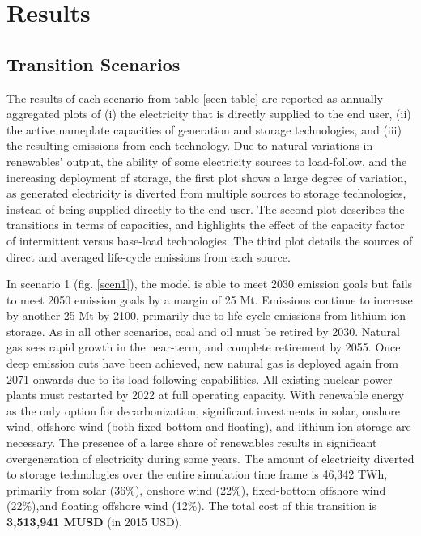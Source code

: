\section{Results} \label{Results-and-discussion}

\subsection{Transition Scenarios}


The results of each scenario from table \ref{scen-table} are reported as annually aggregated plots of (i) the electricity that is directly supplied to the end user, (ii) the active nameplate capacities of generation and storage technologies, and (iii) the resulting emissions from each technology. Due to natural variations in renewables' output, the ability of some electricity sources to load-follow, and the increasing deployment of storage, the first plot shows a large degree of variation, as generated electricity is diverted from multiple sources to storage technologies, instead of being supplied directly to the end user. The second plot describes the transitions in terms of capacities, and highlights the effect of the capacity factor of intermittent versus base-load technologies. The third plot details the sources of direct and averaged life-cycle emissions from each source.

In scenario 1 (fig. \ref{scen1}), the model is able to meet 2030 emission goals but fails to meet 2050 emission goals by a margin of 25 Mt. Emissions continue to increase by another 25 Mt by 2100, primarily due to life cycle emissions from lithium ion storage. As in all other scenarios, coal and oil must be retired by 2030. Natural gas sees rapid growth in the near-term, and complete retirement by 2055. Once deep emission cuts have been achieved, new natural gas is deployed again from 2071 onwards due to its load-following capabilities. All existing nuclear power plants must restarted by 2022 at full operating capacity. With renewable energy as the only option for decarbonization, significant investments in solar, onshore wind, offshore wind (both fixed-bottom and floating), and lithium ion storage are necessary. The presence of a large share of renewables results in significant overgeneration of electricity during some years. The amount of electricity diverted to storage technologies over the entire simulation time frame is 46,342 TWh, primarily from solar (36\%), onshore wind (22\%), fixed-bottom offshore wind (22\%),and floating offshore wind (12\%). The total cost of this transition is \textbf{3,513,941 MUSD} (in 2015 USD).


